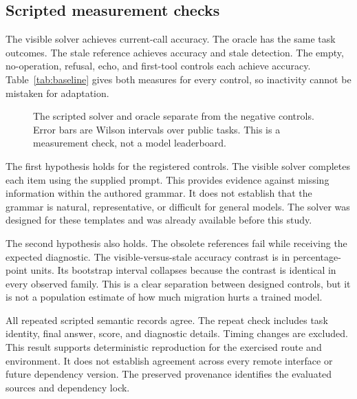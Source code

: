 \documentclass{article}
\begin{document}
\subsection{Scripted measurement checks}
The visible solver achieves \VisibleRate{} current-call accuracy. The oracle has the same task outcomes. The stale reference achieves \FloorRate{} accuracy and \StaleRate{} stale detection. The empty, no-operation, refusal, echo, and first-tool controls each achieve \FloorRate{} accuracy. Table~\ref{tab:baseline} gives both measures for every control, so inactivity cannot be mistaken for adaptation.\par
\begin{table}[t]\centering\small
\caption{Scripted controls on the public set. Brackets show task-level Wilson intervals. Oracle and stale controls intentionally access reference answers.}\label{tab:baseline}\end{table}
\begin{figure}[t]\centering{}\caption{The scripted solver and oracle separate from the negative controls. Error bars are Wilson intervals over public tasks. This is a measurement check, not a model leaderboard.}\label{fig:baseline}\end{figure}
The first hypothesis holds for the registered controls. The visible solver completes each item using the supplied prompt. This provides evidence against missing information within the authored grammar. It does not establish that the grammar is natural, representative, or difficult for general models. The solver was designed for these templates and was already available before this study.\par
The second hypothesis also holds. The obsolete references fail while receiving the expected diagnostic. The visible-versus-stale accuracy contrast is \PairDifference{} in percentage-point units. Its bootstrap interval collapses because the contrast is identical in every observed family. This is a clear separation between designed controls, but it is not a population estimate of how much migration hurts a trained model.\par
All repeated scripted semantic records agree. The repeat check includes task identity, final answer, score, and diagnostic details. Timing changes are excluded. This result supports deterministic reproduction for the exercised route and environment. It does not establish agreement across every remote interface or future dependency version. The preserved provenance identifies the evaluated sources and dependency lock.\par
\end{document}
